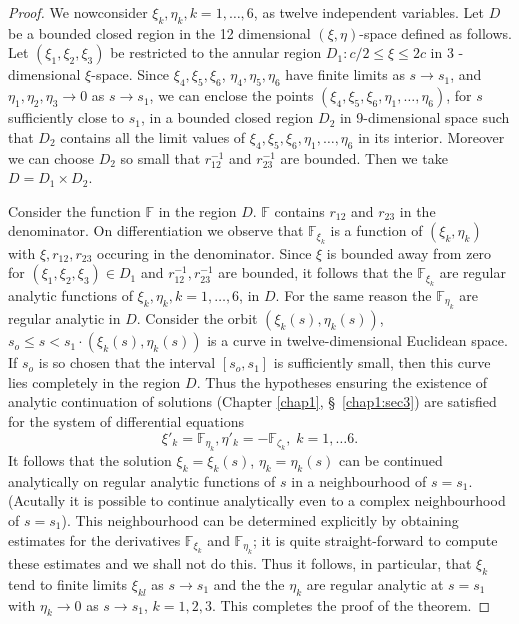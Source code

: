 \begin{proof}
We now\pageoriginale consider $\xi_k, \eta_k, k =1, \ldots, 6$, as twelve independent variables. Let $D$ be a bounded closed region in the 12 dimensional $(\xi, \eta)$-space defined as follows. Let $(\xi_1, \xi_2, \xi_3)$ be restricted to the annular region $D_1 : c/2 \leq \xi \leq 2c$ in 3 - dimensional $\xi$-space. Since $\xi_4, \xi_5, \xi_6$, $\eta_4 , \eta_5, \eta_6$ have finite limits as $s \to s_1$, and $\eta_1, \eta_2, \eta_3 \to 0$ as $s \to s_1$, we can enclose the points $(\xi_4, \xi_5, \xi_6, \eta_1, \ldots, \eta_6)$, for $s$ sufficiently close to $s_1$, in a bounded closed region $D_2$ in 9-dimensional space such that $D_2$ contains all the limit values of $\xi_4, \xi_5, \xi_6,\eta_1, \ldots, \eta_6$ in its interior. Moreover we can choose $D_2$ so small that $r^{-1}_{12}$ and $r^{-1}_{23}$ are bounded. Then we take $D = D_1 \times D_2$. 

Consider the function $\mathbb{F}$ in the region $D$. $\mathbb{F}$ contains $r_{12}$ and $r_{23}$ in the denominator. On  differentiation we observe that $\mathbb{F}_{\xi_k}$ is a function of $(\xi_k, \eta_k)$ with $\xi, r_{12}, r_{23}$ occuring in the denominator. Since $\xi$ is bounded away from zero for $(\xi_1, \xi_2, \xi_3) \in D_1$ and $r^{-1}_{12}, r^{-1}_{23}$ are bounded, it follows that the $\mathbb{F}_{\xi_k}$ are regular analytic functions of $\xi_k,\eta_k, k = 1,\ldots, 6$, in $D$. For the same reason the $\mathbb{F}_{\eta_k}$ are regular analytic in $D$. Consider the orbit $(\xi_k(s), \eta_k(s))$, $s_o \leq s < s_1 \cdot (\xi_k(s), \eta_k(s))$ is a curve in twelve-dimensional Euclidean space. If $s_o$ is so chosen that the interval $[s_o, s_1]$ is sufficiently small, then this curve lies completely in the region $D$. Thus the hypotheses ensuring the existence of analytic continuation of solutions (Chapter  \ref{chap1}, \S\ \ref{chap1:sec3}) are satisfied for the system of differential equations
$$
\xi'_k = \mathbb{F}_{\eta_k}, \eta'_k = - \mathbb{F}_{\zeta_k}, \; k = 1, \ldots 6.
$$\pageoriginale
It follows that the solution $\xi_k = \xi_k (s)$, $\eta_k = \eta_k (s)$ can be continued analytically on regular analytic functions of $s$ in a neighbourhood of $s = s_1$. (Acutally it is possible to continue analytically even to a complex neighbourhood of $s = s_1$). This neighbourhood can be determined explicitly by obtaining estimates for the derivatives $\mathbb{F}_{\xi_k}$  and $\mathbb{F}_{\eta_k}$; it is quite straight-forward to compute these estimates and we shall not do this. Thus it follows, in particular, that $\xi_k$ tend to finite limits $\xi_{kl}$ as $s \to s_1$ and the the $\eta_k$ are regular analytic at $s = s_1$ with $\eta_k \to 0$ as $s \to s_1$, $k = 1,2,3$. This completes the proof of the theorem.
\end{proof}

